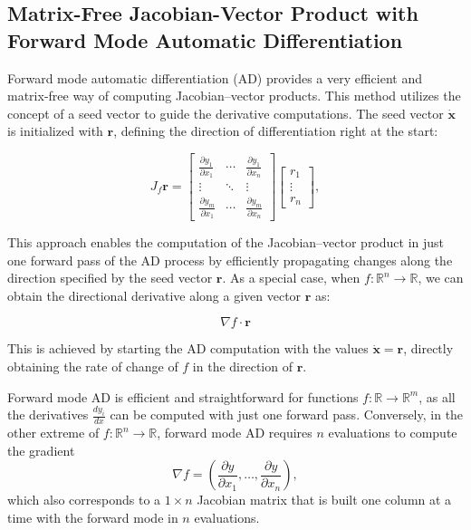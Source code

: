 \subsection*{Matrix-Free Jacobian-Vector Product with Forward Mode Automatic Differentiation}

Forward mode automatic differentiation (AD) provides a very efficient and matrix-free way of computing Jacobian--vector products. This method utilizes the concept of a seed vector to guide the derivative computations. The seed vector \(\dot{\mathbf{x}}\) is initialized with \(\mathbf{r}\), defining the direction of differentiation right at the start:

\[
J_f \mathbf{r} = \begin{bmatrix}
    \frac{\partial y_1}{\partial x_1} & \cdots & \frac{\partial y_1}{\partial x_n} \\
    \vdots & \ddots & \vdots \\
    \frac{\partial y_m}{\partial x_1} & \cdots & \frac{\partial y_m}{\partial x_n} 
\end{bmatrix} \begin{bmatrix}
    r_1 \\
    \vdots \\
    r_n
\end{bmatrix},
\]

This approach enables the computation of the Jacobian--vector product in just one forward pass of the AD process by efficiently propagating changes along the direction specified by the seed vector \(\mathbf{r}\). As a special case, when \( f : \mathbb{R}^n \to \mathbb{R} \), we can obtain the directional derivative along a given vector \(\mathbf{r}\) as:

\[
\nabla f \cdot \mathbf{r}
\]

This is achieved by starting the AD computation with the values \(\dot{\mathbf{x}} = \mathbf{r}\), directly obtaining the rate of change of \(f\) in the direction of \(\mathbf{r}\). 


Forward mode AD is efficient and straightforward for functions $f : \mathbb{R} \to \mathbb{R}^m$, as all the derivatives $\frac{dy_i}{dx}$ can be computed with just one forward pass. Conversely, in the other extreme of $f : \mathbb{R}^n \to \mathbb{R}$, forward mode AD requires $n$ evaluations to compute the gradient
\[
\nabla f = \left(\frac{\partial y}{\partial x_1}, \dots, \frac{\partial y}{\partial x_n}\right),
\]
which also corresponds to a $1 \times n$ Jacobian matrix that is built one column at a time with the forward mode in $n$ evaluations.



